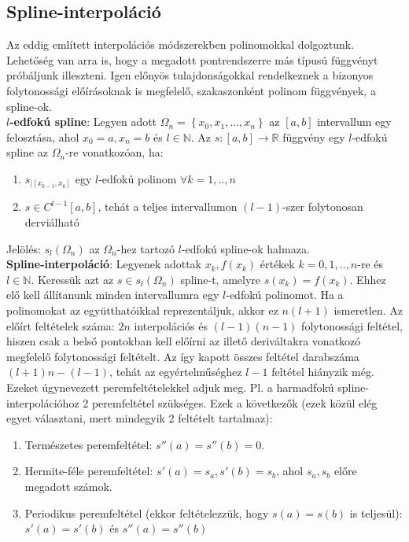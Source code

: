 \documentclass[margin=0px]{article}
\begin{document}
	\subsection{Spline-interpoláció}
	
	Az eddig említett interpolációs módszerekben polinomokkal dolgoztunk. Lehetőség van arra is, hogy a megadott pontrendszerre más
	típusú függvényt próbáljunk illeszteni. Igen előnyös tulajdonságokkal rendelkeznek a bizonyos folytonossági előírásoknak is
	megfelelő, szakaszonként polinom függvények, a spline-ok.\\
	
	\noindent \textbf{$l$-edfokú spline}: Legyen adott $\Omega_{n} = \left\{x_{0}, x_{1}, ..., x_{n}\right\}$ az $[a,b]$ intervallum egy
	felosztása, ahol $x_{0}=a, x_{n}=b$ és $l \in \mathbb{N}$. Az $s:[a,b] \to \mathbb{R}$ függvény egy $l$-edfokú spline az
	$\Omega_{n}$-re vonatkozóan, ha:
	
	\begin{enumerate}
		\item	$s_{|[x_{k-1},x_{k}]}$ egy $l$-edfokú polinom $\forall k = 1,..,n$
		
		\item	$s \in C^{l-1}[a,b]$, tehát a teljes intervallumon $(l-1)$-szer folytonosan derviálható
	\end{enumerate}
	
	\noindent Jelölés: $s_{l}(\Omega_{n})$ az $\Omega_{n}$-hez tartozó $l$-edfokú spline-ok halmaza.\\
	
	\noindent \textbf{Spline-interpoláció}: Legyenek adottak $x_{k},f(x_{k})$ értékek $k=0,1,..,n$-re és $l \in \mathbb{N}$.
	Keressük azt az $s \in s_{l}(\Omega_{n})$ spline-t, amelyre $s(x_{k}) = f(x_{k})$. Ehhez elő kell állítanunk minden
	intervallumra egy $l$-edfokú polinomot. Ha a polinomokat az együtthatóikkal reprezentáljuk, akkor ez $n(l+1)$ ismeretlen.
	Az előírt feltételek száma: $2n$ interpolációs és $(l-1)(n-1)$ folytonossági feltétel, hiszen csak a belső pontokban kell
	előírni az illető deriváltakra vonatkozó megfelelő folytonossági feltételt. Az így kapott összes feltétel darabszáma
	$(l+1)n - (l-1)$, tehát az egyértelműséghez $l-1$ feltétel hiányzik még. Ezeket úgynevezett peremfeltételekkel adjuk meg.
	Pl. a harmadfokú spline-interpolációhoz 2 peremfeltétel szükséges. Ezek a következők (ezek közül elég egyet választani,
	mert mindegyik 2 feltételt tartalmaz):
	
	\begin{enumerate}
		\item	Természetes peremfeltétel: $s''(a) = s''(b) = 0$.
		
		\item	Hermite-féle peremfeltétel: $s'(a) = s_{a}, s'(b) = s_{b}$, ahol $s_{a}, s_{b}$ előre megadott számok.
		
		\item	Periodikus peremfeltétel (ekkor feltételezzük, hogy $s(a) = s(b)$ is teljesül):
		$s'(a) = s'(b)$ és $s''(a) = s''(b)$
	\end{enumerate}
	
\end{document}
